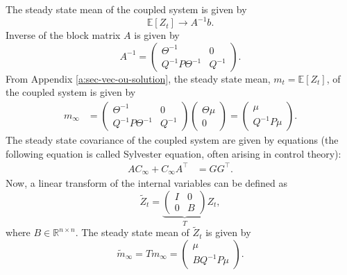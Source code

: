 \documentclass[11pt]{article}
\begin{document}
The steady state mean of the coupled system is given by
\begin{equation}
    \mathbb{E}[Z_t] \to A^{-1}b.
\end{equation}
Inverse of the block matrix $A$ is given by
\begin{equation}
    A^{-1} = \begin{pmatrix}
        \Theta^{-1}        & 0      \\
        Q^{-1}P\Theta^{-1} & Q^{-1}
    \end{pmatrix}.
\end{equation}
From Appendix \ref{a:sec-vec-ou-solution}, the steady state mean, $m_t = \mathbb{E}[Z_t]$, of the coupled system is given by
\begin{align}
    m_\infty & = \begin{pmatrix}
                     \Theta^{-1}        & 0      \\
                     Q^{-1}P\Theta^{-1} & Q^{-1}
                 \end{pmatrix}
    \begin{pmatrix}
        \Theta\mu \\
        0
    \end{pmatrix}              = \begin{pmatrix}
                                     \mu \\
                                     Q^{-1}P\mu
                                 \end{pmatrix}.
\end{align}
The steady state covariance of the coupled system are given by equations (the following equation is called Sylvester equation, often arising in control theory):
\begin{align}
    AC_\infty
    +C_\infty
    A^\top
     & =GG^\top.
\end{align}
Now, a linear transform of the internal variables can be defined as
\begin{equation}
    \widetilde{Z}_t = \underbrace{\begin{pmatrix}
            I & 0 \\
            0 & B
        \end{pmatrix}}_{T}Z_t,
\end{equation}
where $B \in \mathbb{R}^{n \times n}$.
The steady state mean of $\widetilde{Z}_t$ is given by
\begin{equation}
    \widetilde{m}_\infty = T m_\infty  = \begin{pmatrix}
        \mu \\
        BQ^{-1}P\mu
    \end{pmatrix}.
\end{equation}
\end{document}

